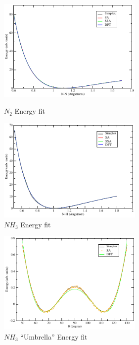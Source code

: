 \begin{figure}[!htb]
\begin{minipage}[!htb]{7.6cm}
\begin{center}
\includegraphics[width=7cm]{figures/n2}
\end{center}
\caption{$N_2$ Energy fit}
\label{fitn2}
\end{minipage}
%
\begin{minipage}[!htb]{7.6cm}
\begin{center}
\includegraphics[width=7cm]{figures/nh3}
\end{center}
\caption{$NH_3$ Energy fit}
\label{fitnh3}
\end{minipage}
\end{figure}
%
\begin{figure}
\begin{center}
\includegraphics[width=7cm]{figures/nh3u}
\caption{$NH_3$ ``Umbrella'' Energy fit}
\label{fitnh3um}
\end{center}
\end{figure}
